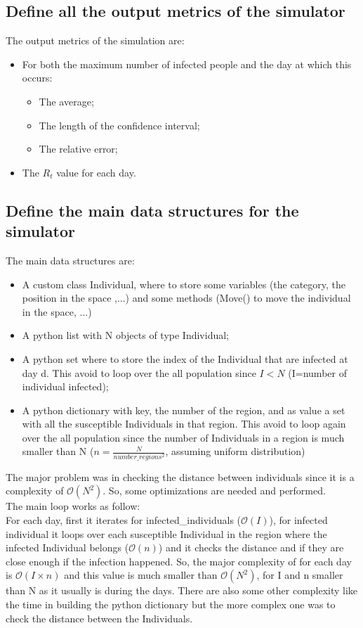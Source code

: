 \documentclass{report}
\begin{document}
{				\subsection{Define all the output metrics of the simulator}
				The output metrics of the simulation are:
				\begin{itemize}
					\item For both the maximum number of infected people and the day at which this occurs:
					\begin{itemize}
						\item The average;
						\item The length of the confidence interval;
						\item The relative error;
					\end{itemize}
					\item The $R_t$ value for each day.
				\end{itemize}
			
			\subsection{Define the main data structures for the simulator}
						The main data structures are: 
							\begin{itemize}
								\item A custom class Individual, where to store some variables (the category, the position in the space ,...) and some methods (Move() to move the individual in the space, ...)
								\item A python list with N objects of type Individual;
								\item A python set where to store the index of the Individual that are infected at day d. This avoid to loop over the all population since $I<N$ (I=number of individual infected);
								\item A python dictionary with key, the number of the region, and as value a set with all the susceptible Individuals in that region. This avoid to loop again over the all population since the number of Individuals in a region is much smaller than N ($n=\frac{N}{number\_regions^2}$, assuming uniform distribution)
							\end{itemize}
							The major problem was in checking the distance between individuals since it is a complexity of $\mathcal{O}(N^2)$. So, some optimizations are needed and performed. \\ The main loop works as follow: \\ For each day, first it iterates for infected\_individuals ($\mathcal{O}(I)$), for infected individual it loops over each susceptible Individual in the region where the infected Individual belongs ($\mathcal{O}(n)$) and it checks the distance and if they are close enough if the infection happened. So, the major complexity of for each day is $\mathcal{O}(I \times n)$ and this value is much smaller than $\mathcal{O}(N^2)$, for I and n smaller than N as it usually is during the days. There are also some other complexity like the time in building the python dictionary but the more complex one was to check the distance between the Individuals.
					
}
\end{document}
